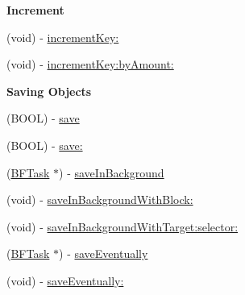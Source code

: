 \begin{Indent}{\bf Increment}\par
{\em 

 

 }\begin{DoxyCompactItemize}
\item 
(void) -\/ \hyperlink{interface_p_f_object_aa56894782ce606ff221d224a235d11e9}{increment\+Key\+:}
\item 
(void) -\/ \hyperlink{interface_p_f_object_a9faadc60497971f463549a28848f4e7e}{increment\+Key\+:by\+Amount\+:}
\end{DoxyCompactItemize}
\end{Indent}
\begin{Indent}{\bf Saving Objects}\par
{\em 

 

 }\begin{DoxyCompactItemize}
\item 
(B\+O\+O\+L) -\/ \hyperlink{interface_p_f_object_a3f4fb72a9a33abafce4ebdbb61c87631}{save}
\item 
(B\+O\+O\+L) -\/ \hyperlink{interface_p_f_object_a7e589a961320f1b1d1f44f96648f1529}{save\+:}
\item 
(\hyperlink{interface_b_f_task}{B\+F\+Task} $\ast$) -\/ \hyperlink{interface_p_f_object_a07c14496c1b1f106101f6e4aa16bec6b}{save\+In\+Background}
\item 
(void) -\/ \hyperlink{interface_p_f_object_a2eea7c4efcbb46f4466b439853322193}{save\+In\+Background\+With\+Block\+:}
\item 
(void) -\/ \hyperlink{interface_p_f_object_afae50e6f500694d47642ffb001d161e4}{save\+In\+Background\+With\+Target\+:selector\+:}
\item 
(\hyperlink{interface_b_f_task}{B\+F\+Task} $\ast$) -\/ \hyperlink{interface_p_f_object_a6d26d04b44a2b3ab9a2cfbadecedaae5}{save\+Eventually}
\item 
(void) -\/ \hyperlink{interface_p_f_object_a5c71fde395b8fd8c33ff85bbcf79afd9}{save\+Eventually\+:}
\end{DoxyCompactItemize}
\end{Indent}
